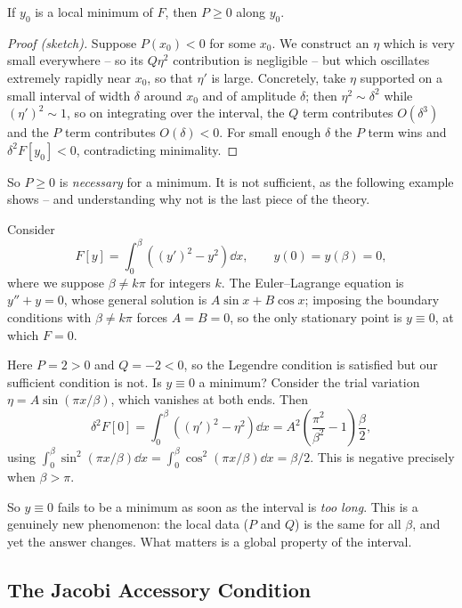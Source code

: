 \begin{proposition}
	If $y_0$ is a local minimum of $F$, then $P \geq 0$ along $y_0$.
\end{proposition}
\begin{proof}[Proof (sketch)]
	Suppose $P(x_0) < 0$ for some $x_0$. We construct an $\eta$ which is very small everywhere -- so its $Q\eta^2$ contribution is negligible -- but which oscillates extremely rapidly near $x_0$, so that $\eta'$ is large. Concretely, take $\eta$ supported on a small interval of width $\delta$ around $x_0$ and of amplitude $\delta$; then $\eta^2 \sim \delta^2$ while $(\eta')^2 \sim 1$, so on integrating over the interval, the $Q$ term contributes $O(\delta^3)$ and the $P$ term contributes $O(\delta) < 0$. For small enough $\delta$ the $P$ term wins and $\delta^2 F[y_0] < 0$, contradicting minimality.
\end{proof}

So $P \geq 0$ is \emph{necessary} for a minimum. It is not sufficient, as the following example shows -- and understanding why not is the last piece of the theory.

\begin{example}\label{eg:toolong}
	Consider
	$$
	F[y] = \int_0^\beta\left((y')^2 - y^2\right)\dd x, \qquad y(0) = y(\beta) = 0,
	$$
	where we suppose $\beta \neq k\pi$ for integers $k$. The Euler--Lagrange equation is $y'' + y = 0$, whose general solution is $A\sin x + B\cos x$; imposing the boundary conditions with $\beta\neq k\pi$ forces $A = B = 0$, so the only stationary point is $y \equiv 0$, at which $F = 0$.

	Here $P = 2 > 0$ and $Q = -2 < 0$, so the Legendre condition is satisfied but our sufficient condition is not. Is $y \equiv 0$ a minimum? Consider the trial variation $\eta = A\sin(\pi x/\beta)$, which vanishes at both ends. Then
	$$
	\delta^2 F[0] = \int_0^\beta\left((\eta')^2 - \eta^2\right)\dd x = A^2\left(\frac{\pi^2}{\beta^2} - 1\right)\frac{\beta}{2},
	$$
	using $\int_0^\beta \sin^2(\pi x/\beta)\dd x = \int_0^\beta\cos^2(\pi x/\beta)\dd x = \beta/2$. This is negative precisely when $\beta > \pi$.

	So $y \equiv 0$ fails to be a minimum as soon as the interval is \emph{too long}. This is a genuinely new phenomenon: the local data ($P$ and $Q$) is the same for all $\beta$, and yet the answer changes. What matters is a global property of the interval.
\end{example}

\subsection{The Jacobi Accessory Condition}

